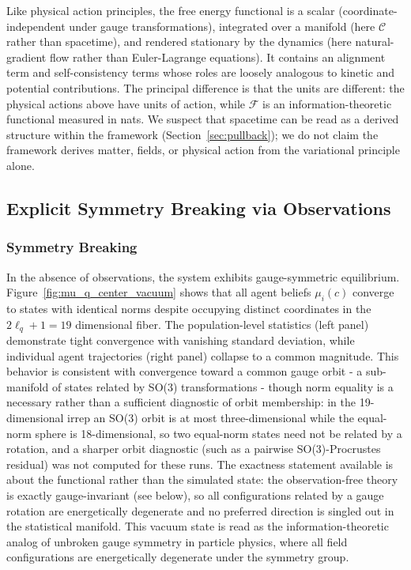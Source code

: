\documentclass[11pt]{article}
\begin{document}
Like physical action principles, the free energy functional is a scalar (coordinate-independent under gauge transformations), integrated over a manifold (here $\mathcal{C}$ rather than spacetime), and rendered stationary by the dynamics (here natural-gradient flow rather than Euler-Lagrange equations). It contains an alignment term and self-consistency terms whose roles are loosely analogous to kinetic and potential contributions. The principal difference is that the units are different: the physical actions above have units of action, while $\mathcal{F}$ is an information-theoretic functional measured in nats. We suspect that spacetime can be read as a derived structure within the framework (Section~\ref{sec:pullback}); we do not claim the framework derives matter, fields, or physical action from the variational principle alone.

\subsection{Explicit Symmetry Breaking via Observations}
\label{sec:symmetry_breaking}

\subsubsection{Symmetry Breaking}

In the absence of observations, the system exhibits gauge-symmetric equilibrium. Figure~\ref{fig:mu_q_center_vacuum} shows that all agent beliefs $\mu_i(c)$ converge to states with identical norms despite occupying distinct coordinates in the $2\ell_q + 1 = 19$ dimensional fiber. The population-level statistics (left panel) demonstrate tight convergence with vanishing standard deviation, while individual agent trajectories (right panel) collapse to a common magnitude. This behavior is consistent with convergence toward a common gauge orbit - a sub-manifold of states related by SO(3) transformations - though norm equality is a necessary rather than a sufficient diagnostic of orbit membership: in the 19-dimensional irrep an SO(3) orbit is at most three-dimensional while the equal-norm sphere is 18-dimensional, so two equal-norm states need not be related by a rotation, and a sharper orbit diagnostic (such as a pairwise SO(3)-Procrustes residual) was not computed for these runs. The exactness statement available is about the functional rather than the simulated state: the observation-free theory is exactly gauge-invariant (see below), so all configurations related by a gauge rotation are energetically degenerate and no preferred direction is singled out in the statistical manifold. This vacuum state is read as the information-theoretic analog of unbroken gauge symmetry in particle physics, where all field configurations are energetically degenerate under the symmetry group.
\end{document}

